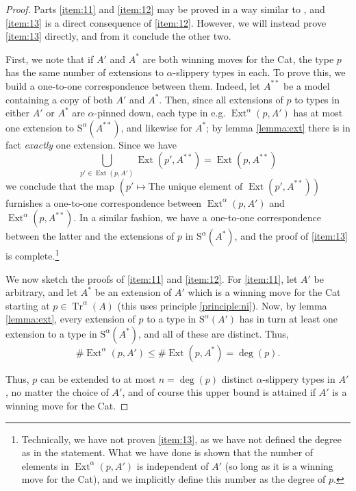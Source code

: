 \documentclass{article}
\theoremstyle{nonumberplain}
\newtheorem{proof}{Proof}
\newcommand{\Stone}{\mathrm{S}}
\DeclareMathOperator{\Tr}{Tr}
\DeclareMathOperator{\Ext}{Ext}
\begin{document}
\begin{proof}
Parts \ref{item:11} and \ref{item:12} may be proved in a way similar to \cite{morley}, and \ref{item:13} is a direct consequence of \ref{item:12}. However, we will instead prove \ref{item:13} directly, and from it conclude the other two.

First, we note that if $A'$ and $A^*$ are both winning moves for the Cat, the type $p$ has the same number of extensions to $\alpha$-slippery types in each. To prove this, we build a one-to-one correspondence between them. Indeed, let $A^{**}$ be a model containing a copy of both $A'$ and $A^*$. Then, since all extensions of $p$ to types in either $A'$ or $A^*$ are $\alpha$-pinned down, each type in e.g. $\Ext^\alpha(p, A')$ has at most one extension to $\Stone^\alpha(A^{**})$, and likewise for $A^*$; by lemma \ref{lemma:ext} there is in fact \emph{exactly} one extension. Since we have
\begin{equation}
\bigcup_{p' \in \Ext(p,A')} \Ext(p', A^{**}) = \Ext(p, A^{**})
\end{equation}
we conclude that the map $(p' \mapsto \text{The unique element of $\Ext(p', A^{**})$})$ furnishes a one-to-one correspondence between $\Ext^\alpha(p, A')$ and $\Ext^\alpha(p,A^{**})$. In a similar fashion, we have a one-to-one correspondence between the latter and the extensions of $p$ in $\Stone^\alpha(A^*)$, and the proof of \ref{item:13} is complete.\footnote{Technically, we have not proven \ref{item:13}, as we have not defined the degree as in the statement. What we have done is shown that the number of elements in $\Ext^\alpha(p,A')$ is independent of $A'$ (so long as it is a winning move for the Cat), and we implicitly define this number as the degree of $p$.}

We now sketch the proofs of \ref{item:11} and \ref{item:12}. For \ref{item:11}, let $A'$ be arbitrary, and let $A^*$ be an extension of $A'$ which is a winning move for the Cat starting at $p \in \Tr^\alpha(A)$ (this uses principle \ref{principle:ni}). Now, by lemma \ref{lemma:ext}, every extension of $p$ to a type in $\Stone^\alpha(A')$ has in turn at least one extension to a type in $\Stone^\alpha(A^*)$, and all of these are distinct. Thus,
\begin{equation}
\#\Ext^\alpha(p,A') \leq \#\Ext(p, A^*) = \deg(p).
\end{equation}

Thus, $p$ can be extended to at most $n = \deg(p)$ distinct $\alpha$-slippery types in $A'$, no matter the choice of $A'$, and of course this upper bound is attained if $A'$ is a winning move for the Cat.


\end{proof}
\end{document}
